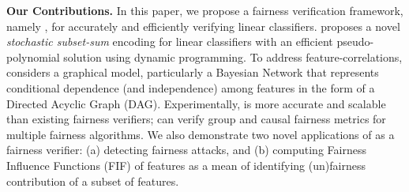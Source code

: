 	
	

	

	
	
%	
%	
	

	
	
	\textbf{Our Contributions.} In this paper, we propose a fairness verification framework, namely {\fvgm}, for accurately and efficiently verifying linear classifiers. {\fvgm} proposes a novel \textit{stochastic subset-sum} encoding for linear classifiers with an efficient pseudo-polynomial solution using dynamic programming. To address feature-correlations, {\fvgm} considers a graphical model, particularly a Bayesian Network that represents conditional dependence (and independence) among features in the form of a Directed Acyclic Graph (DAG).  
	Experimentally,  {\fvgm} is more accurate and scalable than existing fairness verifiers; {\fvgm} can verify group and causal fairness metrics for multiple fairness algorithms. We also demonstrate two novel applications of {\fvgm} as a fairness verifier: (a) detecting fairness attacks, and (b) computing Fairness Influence Functions (FIF) of features as a mean of identifying (un)fairness contribution of a subset of features. 
	


